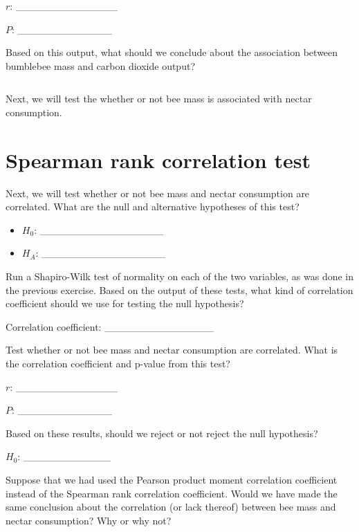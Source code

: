 \documentclass[
  openany]{scrbook}
\begin{document}
\(r\): \_\_\_\_\_\_\_\_\_\_\_\_\_\_

\(P\): \_\_\_\_\_\_\_\_\_\_\_\_\_

Based on this output, what should we conclude about the association between bumblebee mass and carbon dioxide output?

\begin{verbatim}

\end{verbatim}

Next, we will test the whether or not bee mass is associated with nectar consumption.

\hypertarget{spearman-rank-correlation-test}{%
\section{Spearman rank correlation test}\label{spearman-rank-correlation-test}}

Next, we will test whether or not bee mass and nectar consumption are correlated.
What are the null and alternative hypotheses of this test?

\begin{itemize}
\item
  \(H_{0}\): \_\_\_\_\_\_\_\_\_\_\_\_\_\_\_\_\_
\item
  \(H_{A}\): \_\_\_\_\_\_\_\_\_\_\_\_\_\_\_\_\_
\end{itemize}

Run a Shapiro-Wilk test of normality on each of the two variables, as was done in the previous exercise.
Based on the output of these tests, what kind of correlation coefficient should we use for testing the null hypothesis?

Correlation coefficient: \_\_\_\_\_\_\_\_\_\_\_\_\_\_\_

Test whether or not bee mass and nectar consumption are correlated.
What is the correlation coefficient and p-value from this test?

\(r\): \_\_\_\_\_\_\_\_\_\_\_\_\_\_

\(P\): \_\_\_\_\_\_\_\_\_\_\_\_\_

Based on these results, should we reject or not reject the null hypothesis?

\(H_{0}\): \_\_\_\_\_\_\_\_\_\_\_\_

Suppose that we had used the Pearson product moment correlation coefficient instead of the Spearman rank correlation coefficient.
Would we have made the same conclusion about the correlation (or lack thereof) between bee mass and nectar consumption?
Why or why not?
\end{document}
